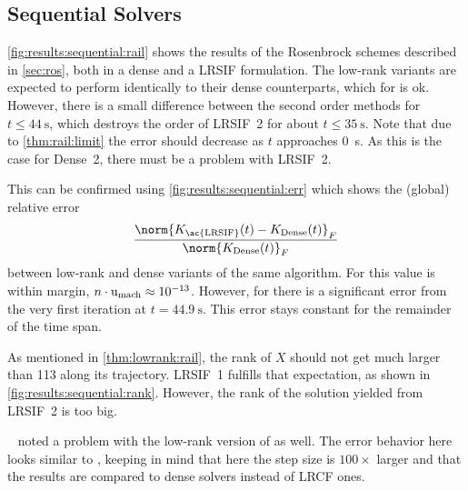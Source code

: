 \subsection{Sequential Solvers}

\autoref{fig:results:sequential:rail} shows the results of the Rosenbrock schemes described in \autoref{sec:ros},
both in a dense and a \ac{LRSIF} formulation.
The low-rank variants are expected to perform identically to their dense counterparts,
which for  is ok.
However, there is a small difference between the second order methods for $t\leq\SI{44}{\second}$,
which destroys the order of \ac{LRSIF}~2 for about $t\leq\SI{35}{\second}$.
Note that due to \autoref{thm:rail:limit} the error should decrease as $t$ approaches \SI{0}{\second}.
As this is the case for Dense~2, there must be a problem with \ac{LRSIF}~2.

This can be confirmed using \autoref{fig:results:sequential:err}
which shows the (global) relative error
\begin{equation}
\label{eq:results:err:lr_v_dense}
  \frac{\norm{K_\text{\ac{LRSIF}}(t) - K_\text{Dense}(t)}_F}{\norm{K_\text{Dense}(t)}_F}
\end{equation}
between low-rank and dense variants of the same algorithm.
For  this value is within margin,
$n \cdot \mathrm u_\text{mach} \approx 10^{-13}$.
However, for  there is a significant error from the very first iteration at $t=\SI[round-precision=1]{44.9}{\second}$.
This error stays constant for the remainder of the time span.

As mentioned in \autoref{thm:lowrank:rail},
the rank of $X$ should not get much larger than 113 along its trajectory.
\ac{LRSIF}~1 fulfills that expectation, as shown in \autoref{fig:results:sequential:rank}.
However, the rank of the solution yielded from \ac{LRSIF}~2 is too big.

\begin{remark}
  \citeauthor{Lang2015}~\cite[63]{Lang2015} noted a problem with the low-rank version of  as well.
  The error behavior here looks similar to \cite[Fig~1]{Lang2015},
  keeping in mind that here the step size is $100\times$ larger
  and that the results are compared to dense solvers instead of \ac{LRCF} ones.
\end{remark}

